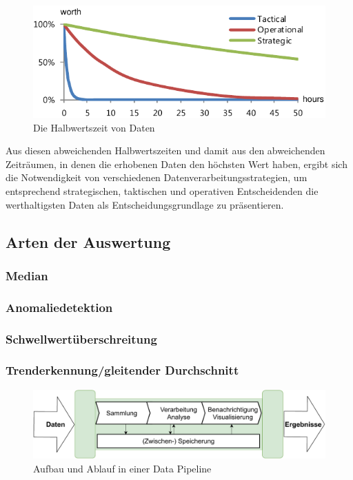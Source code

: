 \begin{figure}[H]
\centering
\includegraphics[width=\textwidth]{graphics/half-life-data.pdf}
\caption[Die Halbwertszeit von Daten]{Die Halbwertszeit von Daten\footnotemark}
\label{abb:DataHalflife}
\end{figure}
Aus diesen abweichenden Halbwertszeiten und damit aus den abweichenden Zeiträumen, in denen die erhobenen Daten den höchsten Wert haben, ergibt sich die Notwendigkeit von verschiedenen Datenverarbeitungsstrategien, um entsprechend strategischen, taktischen und operativen Entscheidenden die werthaltigsten Daten als Entscheidungsgrundlage zu präsentieren.

\subsection{Arten der Auswertung}
\subsubsection{Median}
\subsubsection{Anomaliedetektion}
\subsubsection{Schwellwertüberschreitung}
\subsubsection{Trenderkennung/gleitender Durchschnitt}


\begin{figure}[H]
\centering
\includegraphics[width=\textwidth]{graphics/DataPipeline.pdf}
\caption{Aufbau und Ablauf in einer Data Pipeline}
\label{abb:DataPipeline}
\end{figure}



